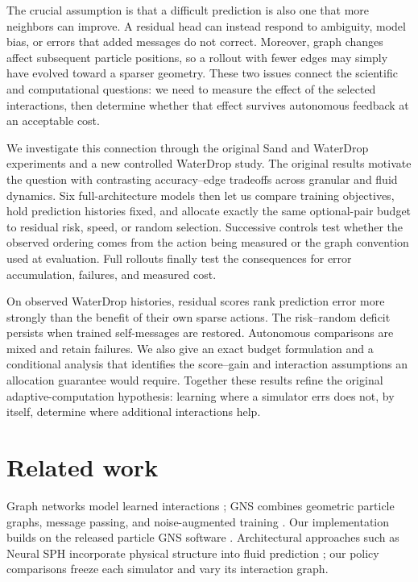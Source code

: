 The crucial assumption is that a difficult prediction is also one that more neighbors can improve. A residual head can instead respond to ambiguity, model bias, or errors that added messages do not correct. Moreover, graph changes affect subsequent particle positions, so a rollout with fewer edges may simply have evolved toward a sparser geometry. These two issues connect the scientific and computational questions: we need to measure the effect of the selected interactions, then determine whether that effect survives autonomous feedback at an acceptable cost.

We investigate this connection through the original Sand and WaterDrop experiments and a new controlled WaterDrop study. The original results motivate the question with contrasting accuracy--edge tradeoffs across granular and fluid dynamics. Six full-architecture models then let us compare training objectives, hold prediction histories fixed, and allocate exactly the same optional-pair budget to residual risk, speed, or random selection. Successive controls test whether the observed ordering comes from the action being measured or the graph convention used at evaluation. Full rollouts finally test the consequences for error accumulation, failures, and measured cost.

On observed WaterDrop histories, residual scores rank prediction error more strongly than the benefit of their own sparse actions. The risk--random deficit persists when trained self-messages are restored. Autonomous comparisons are mixed and retain failures. We also give an exact budget formulation and a conditional analysis that identifies the score--gain and interaction assumptions an allocation guarantee would require. Together these results refine the original adaptive-computation hypothesis: learning where a simulator errs does not, by itself, determine where additional interactions help.

\section{Related work}
Graph networks model learned interactions \citep{battaglia2016}; GNS combines geometric particle graphs, message passing, and noise-augmented training \citep{sanchez2020}. Our implementation builds on the released particle GNS software \citep{kumar2023}. Architectural approaches such as Neural SPH incorporate physical structure into fluid prediction \citep{toshev2024}; our policy comparisons freeze each simulator and vary its interaction graph.

